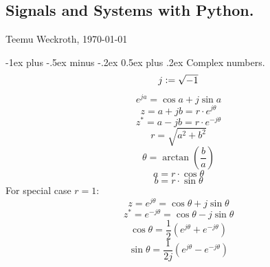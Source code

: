\documentclass[10pt,landscape]{article}
\makeatletter
\renewcommand{\section}{\@startsection{section}{1}{0mm}%
	{-1ex plus -.5ex minus -.2ex}%
	{0.5ex plus .2ex}%
	{\normalfont\large\bfseries}}
\makeatother
\begin{document}
\raggedright
\footnotesize
\begin{multicols}{3}
	
	
	\setlength{\premulticols}{1pt}
	\setlength{\postmulticols}{1pt}
	\setlength{\multicolsep}{1pt}
	\setlength{\columnsep}{2pt}
	
	\part*{Signals and Systems with Python.}
	\begin{center}
		Teemu Weckroth, \today
	\end{center}
	
	\section{Complex numbers.}
	\begin{equation*}
		j \vcentcolon = \sqrt{-1}
	\end{equation*}
	\begin{equation*}
		e^{j a} = \cos{a} + j \sin{a}
	\end{equation*}
	\begin{equation*}
		z = a + jb = r \cdot e^{j \theta}
	\end{equation*}
	\begin{equation*}
		z^* = a - j b = r \cdot e^{- j \theta}
	\end{equation*}
	\begin{equation*}
		r = \sqrt{a^2 + b^2}
	\end{equation*}
	\begin{equation*}
		\theta = \arctan\left( \frac{b}{a}\right)
	\end{equation*}
	\begin{equation*}
		a = r \cdot \cos{\theta}
	\end{equation*}
	\begin{equation*}
		b = r \cdot \sin{\theta}
	\end{equation*}
	For special case $r = 1$:
	\begin{equation*}
		z = e^{j \theta} = \cos{\theta} + j \sin{\theta}
	\end{equation*}
	\begin{equation*}
		z^{*} = e^{- j \theta} = \cos{\theta} - j \sin{\theta}
	\end{equation*}
	\begin{equation*}
		\cos{\theta} = \frac{1}{2} \left(e^{j \theta} + e^{- j \theta}\right)
	\end{equation*}
	\begin{equation*}
		\sin{\theta} = \frac{1}{2j} \left(e^{j \theta} - e^{- j \theta}\right)
	\end{equation*}
	

\end{multicols}
\end{document}

